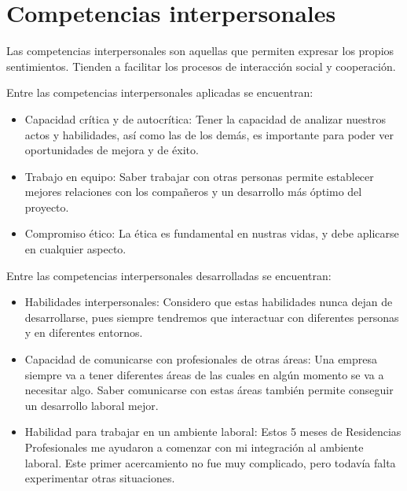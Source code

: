 \section{Competencias interpersonales}
Las competencias interpersonales son aquellas que permiten expresar los propios sentimientos. Tienden a facilitar los procesos de interacción social y cooperación.

Entre las competencias interpersonales aplicadas se encuentran:
 \begin{itemize}
    \item Capacidad crítica y de autocrítica: Tener la capacidad de analizar nuestros actos y habilidades, así como las de los demás, es importante para poder ver oportunidades de mejora y de éxito.
    \item Trabajo en equipo: Saber trabajar con otras personas permite establecer mejores relaciones con los compañeros y un desarrollo más óptimo del proyecto.
    \item Compromiso ético: La ética es fundamental en nustras vidas, y debe aplicarse en cualquier aspecto. 
 \end{itemize}

Entre las competencias interpersonales desarrolladas se encuentran:
 \begin{itemize}
    \item Habilidades interpersonales: Considero que estas habilidades nunca dejan de desarrollarse, pues siempre tendremos que interactuar con diferentes personas y en diferentes entornos.
    \item Capacidad de comunicarse con profesionales de otras áreas: Una empresa siempre va a tener diferentes áreas de las cuales en algún momento se va a necesitar algo. Saber comunicarse con estas áreas también permite conseguir un desarrollo laboral mejor.
    \item Habilidad para trabajar en un ambiente laboral: Estos 5 meses de Residencias Profesionales me ayudaron a comenzar con mi integración al ambiente laboral. Este primer acercamiento no fue muy complicado, pero todavía falta experimentar otras situaciones.
 \end{itemize}